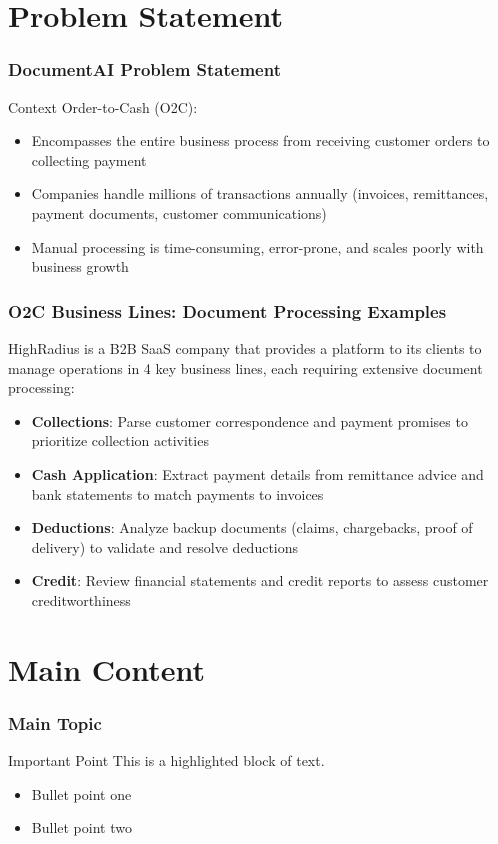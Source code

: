 \documentclass{beamer}
\begin{document}
\section{Problem Statement}

\begin{frame}
\frametitle{DocumentAI Problem Statement}
\begin{block}{Context}
Order-to-Cash (O2C):
\begin{itemize}
    \item Encompasses the entire business process from receiving customer orders to collecting payment
    \item Companies handle millions of transactions annually (invoices, remittances, payment documents, customer communications)
    \item Manual processing is time-consuming, error-prone, and scales poorly with business growth
\end{itemize}
\end{block}
\end{frame}

\begin{frame}
\frametitle{O2C Business Lines: Document Processing Examples}
HighRadius is a B2B SaaS company that provides a platform to its clients to manage operations in 4 key business lines, each requiring extensive document processing:

\begin{itemize}
    \item \textbf{Collections}: Parse customer correspondence and payment promises to prioritize collection activities
    \item \textbf{Cash Application}: Extract payment details from remittance advice and bank statements to match payments to invoices
    \item \textbf{Deductions}: Analyze backup documents (claims, chargebacks, proof of delivery) to validate and resolve deductions
    \item \textbf{Credit}: Review financial statements and credit reports to assess customer creditworthiness
\end{itemize}
\end{frame}

\section{Main Content}
\begin{frame}
\frametitle{Main Topic}
\begin{block}{Important Point}
This is a highlighted block of text.
\end{block}

\begin{itemize}
    \item Bullet point one
    \item Bullet point two
\end{itemize}
\end{frame}
\end{document}
